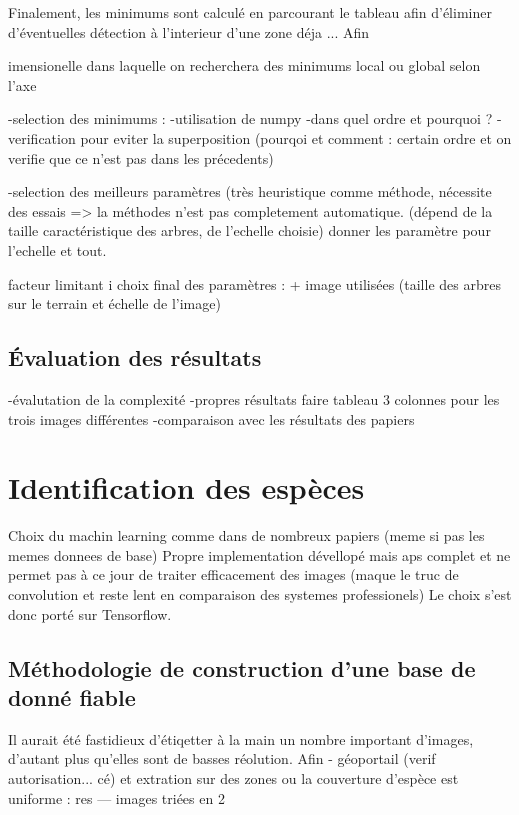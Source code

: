 \documentclass{article}
\begin{document}
	Finalement, les minimums sont calculé en parcourant le tableau afin d'éliminer d'éventuelles détection à l'interieur d'une zone déja ... 
	Afin 

	imensionelle dans laquelle on recherchera des minimums local ou global selon l'axe
		
		-selection des minimums :
			-utilisation de numpy
			-dans quel ordre et pourquoi ?
			-verification pour eviter la superposition (pourqoi et comment : certain ordre et on verifie que ce n'est pas dans les précedents)
	
		-selection des meilleurs paramètres (très heuristique comme méthode, nécessite des essais => la méthodes n'est pas completement automatique. (dépend de la taille caractéristique des arbres, de l'echelle choisie) donner les paramètre pour l'echelle et tout.

		facteur limitant i
		choix final des paramètres : + image utilisées (taille des arbres sur le terrain et échelle de l'image) 

	\subsection{\'{E}valuation des résultats}
		-évalutation de la complexité 
		-propres résultats
		faire tableau 3 colonnes pour les trois images différentes
		-comparaison avec les résultats des papiers 

\section{Identification des espèces}

	Choix du machin learning comme dans de nombreux papiers (meme si pas les memes donnees de base) Propre implementation dévellopé mais aps complet et ne permet pas à ce jour de traiter efficacement des images (maque le truc de convolution et reste lent en comparaison des systemes professionels) Le choix s'est donc porté sur Tensorflow.  

	\subsection{Méthodologie de construction d'une base de donné fiable}
		Il aurait été fastidieux d'étiqetter à la main un nombre important d'images, d'autant plus qu'elles sont de basses réolution. Afin   
		- géoportail (verif autorisation... cé) et extration sur des zones ou la couverture d'espèce est uniforme : res --- images triées en 2
	
\end{document}
